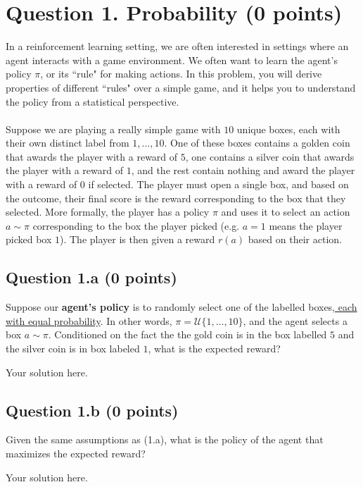 \documentclass[12pt]{article}
\begin{document}

\section*{Question 1. Probability (0 points)}
In a reinforcement learning setting, we are often interested in settings where an agent interacts with a game environment. We often want to learn the agent's policy $\pi$, or its ``rule" for making actions. In this problem, you will derive properties of different ``rules" over a simple game, and it helps you to understand the policy from a statistical perspective.
\\\\
Suppose we are playing a really simple game with $10$ unique boxes, each with their own distinct label from $1,...,10$. One of these boxes contains a golden coin that awards the player with a reward of $5$, one contains a silver coin that awards the player with a reward of $1$, and the rest contain nothing and award the player with a reward of $0$ if selected. The player must open a single box, and based on the outcome, their final score is the reward corresponding to the box that they selected. More formally, the player has a policy $\pi$ and uses it to select an action $a \sim \pi$ corresponding to the box the player picked (e.g. $a=1$ means the player picked box $1$). The player is then given a reward $r(a)$ based on their action.

\subsection*{Question 1.a (0 points)}

Suppose our \textbf{agent's policy} is to randomly select one of the labelled boxes,\href{https://en.wikipedia.org/wiki/Discrete_uniform_distribution}{ each with equal probability}. In other words, $\pi = \mathcal{U}\{1,\dots, 10\}$, and the agent selects a box $a \sim \pi$. Conditioned on the fact the the gold coin is in the box labelled $5$ and the silver coin is in box labeled $1$, what is the expected reward?

\begin{solution}
Your solution here.  
\end{solution}

\subsection*{Question 1.b (0 points)}
Given the same assumptions as (1.a), what is the policy of the agent that maximizes the expected reward?
\begin{solution}
Your solution here. 
\end{solution}
\end{document}
